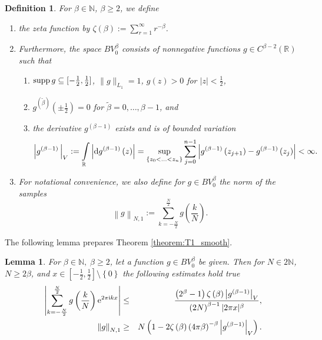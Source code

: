\documentclass[11pt,a4paper,bibtotoc]{scrartcl}
\def\N{\mathbb{N}}
\def\R{\mathbb{R}}
\def\ti{\mbox{\scriptsize{\rm i}}}
\newcommand{\eip}[1]{{\rm e}^{ 2\pi{\ti} #1}}
\renewcommand{\d}{{\rm d}}
\newcommand{\supp}{{\rm supp}}
\newtheorem{lemma}[theorem]{Lemma}
\newtheorem{definition}[theorem]{Definition}
\newenvironment{Lemma}{\goodbreak \begin{lemma}\sl}{\end{lemma}}
\newenvironment{Definition}{\goodbreak \begin{definition}\rm}{\end{definition}}
\numberwithin{equation}{section}
\numberwithin{table}{section}
\numberwithin{figure}{section}
\begin{document}
\begin{Definition}\label{def:BV}
  For $\beta \in \N$, $\beta\ge 2$, we define
  \begin{enumerate}
  \item the {\em zeta function} by $\zeta(\beta):=\sum_{r=1}^{\infty} r^{-\beta}$.
  \item Furthermore, the {\em space} $BV^{\beta}_0$ consists of nonnegative
    functions $g \in C^{\beta-2}(\R)$ such that
    \begin{enumerate}
    \item $\supp\,g\subseteq [-\frac{1}{2},\frac{1}{2}]$, $\|g\|_{L_1}=1$,
      $g(z)>0$ for $|z|<\frac{1}{2}$,
    \item $g^{\left(\tilde\beta\right)}\left(\pm \frac{1}{2}\right)=0$ for
      $\tilde \beta=0,\ldots,\beta-1$, and
    \item the derivative $g^{\left(\beta-1\right)}$ exists and is of bounded
      variation 
      \begin{equation*}
        \left|g^{\left(\beta-1\right)}\,\right|_V
        := \int\limits_{\R}
        \left|\d g^{\left(\beta-1\right)}\left(z\right) \right |=
        \sup\limits_{\left\{z_0 < \hdots < z_n\right\}}
        \sum\limits_{j=0}^{n-1} \left|
          g^{\left(\beta-1\right)}\left(z_{j+1}\right) -
          g^{\left(\beta-1\right)}\left(z_{j}\right) \right| 
        < \infty.
      \end{equation*}
    \end{enumerate}
  \item For notational convenience, we also define for $g\in BV_0^{\beta}$
    the {\em norm of the samples}
    \begin{equation*}
      \left\|g\right\|_{N,1}:=\sum_{k=-\frac{N}{2}}^{\frac{N}{2}}
      g\left(\frac{k}{N}\right). 
    \end{equation*}
  \end{enumerate}
\end{Definition}

The following lemma prepares Theorem \ref{theorem:T1_smooth}.

\begin{Lemma}\label{lemma:decay_g}
  For $\beta \in \mathbb{N},\;\beta\ge 2$, let a function $g\in BV^{\beta}_0$
  be given.
  Then for $N\in 2\N$, $N\ge 2\beta$, and $x \in \left[-\frac{1}{2},
  \frac{1}{2}\right]\setminus\left\{0\right\}$ the following estimates
  hold true
  \begin{eqnarray*}
    \left| \sum\limits_{k=-\frac{N}{2}}^{\frac{N}{2}}
    g\left(\frac{k}{N}\right) \eip{kx} \right|
    & \le &
    \frac{\left(2^{\beta}-1\right)\zeta\left(\beta\right)
    \left|g^{\left(\beta-1\right)}\right|_V}  
    {\left(2N\right)^{\beta-1} |2\pi x|^{\beta}},\\
    \left\|g\right\|_{N,1}
    & \ge & 
    N\left(1-2\zeta\left(\beta\right) \left(4\pi \beta\right)^{-\beta}
    \left|g^{\left(\beta-1\right)}\right|_V\right). 
  \end{eqnarray*}
\end{Lemma}
\end{document}
